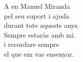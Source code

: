 \thispagestyle{empty}

\vfill

\begin{center}
    \sffamily
    A en Manuel Miranda\\
    pel seu suport i ajuda\\
    durant tots aquests anys.\\
    Sempre estaràs amb mi.\\
    i recordare sempre\\
    el que em vas ensenyar.\\

\end{center}

\vfill